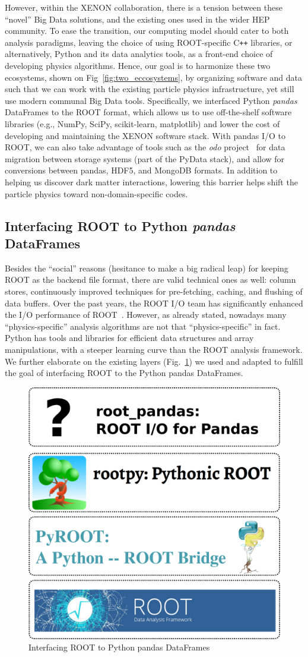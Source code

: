 \documentclass[a4paper]{jpconf}
\begin{document}
However, within the XENON collaboration, there is a tension between these ``novel'' Big Data solutions, and the existing ones used in the wider HEP community.
To ease the transition, our computing model should cater to both analysis paradigms, leaving the choice of using ROOT-specific C\texttt{++} libraries, or alternatively, 
Python and its data analytics tools, as a 
front-end choice of developing physics algorithms. 
Hence, our goal is to harmonize these two ecosystems, shown on Fig~\ref{fig:two_eccosystems}, by organizing software and data
such that we can work with the existing particle physics infrastructure, yet still use modern communal Big Data tools.
Specifically, we interfaced Python \textit{pandas} DataFrames to the ROOT format, which allows us to use 
off-the-shelf software libraries (e.g., NumPy, SciPy, scikit-learn, matplotlib) and lower the cost of developing and maintaining the XENON software stack. 
With pandas I/O to ROOT, we
can also take advantage of tools such as the \textit{odo} project~\cite{odo-pydata} for data migration between storage systems (part of the PyData stack), and allow for conversions between
pandas, HDF5, and MongoDB formats. 
In addition to helping us discover dark matter interactions, lowering this barrier helps shift the particle physics
toward non-domain-specific codes.


\subsection{Interfacing ROOT to Python \textit{pandas} DataFrames}
Besides the ``social'' reasons (hesitance to make a big radical leap) for keeping ROOT as the backend file format, 
there are valid technical ones as well: column stores, continuously improved techniques for pre-fetching, caching, and flushing of data buffers.
Over the past years, the ROOT I/O team has significantly enhanced the I/O performance of ROOT~\cite{1742-6596-331-4-042005}.
However, as already stated, nowadays many ``physics-specific'' analysis algorithms are not that ``physics-specific'' in fact. 
Python has tools and libraries for efficient data structures and array manipulations, with a steeper learning curve than the ROOT analysis framework.
We further elaborate on the existing layers (Fig.~\ref{fig:rootpy_layers}) we used and adapted to fulfill the goal of interfacing ROOT to the Python pandas DataFrames.


\begin{figure}[!t]
\centering
\begin{center}
\includegraphics[width=0.35\linewidth]{./graphics/layers.png}
\caption{Interfacing ROOT to Python pandas DataFrames}
\label{fig:rootpy_layers}
\end{center}
\end{figure}
\end{document}
